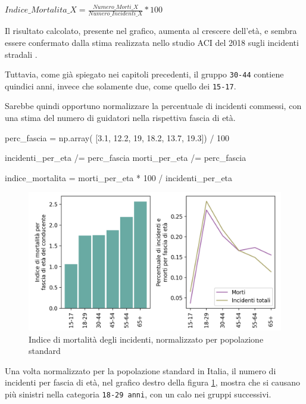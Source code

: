 \documentclass[a4paper]{report}
\newcommand{\columnstyle}[1]{\texttt{#1}}
\begin{document}
\begin{center}
    $Indice\_Mortalita\_X = \displaystyle \frac{Numero\_Morti\_X}{Numero\_Incidenti\_X} * 100$ 
\end{center}

Il risultato calcolato, presente nel grafico, aumenta al crescere dell'età, 
e sembra essere confermato dalla stima realizzata nello studio 
ACI del 2018 sugli incidenti stradali \cite{ACI:3}. 

Tuttavia, come già spiegato nei capitoli precedenti, il gruppo \columnstyle{30-44} 
contiene quindici anni, invece che solamente due, come quello dei \columnstyle{15-17}. 

Sarebbe quindi opportuno normalizzare la percentuale di incidenti commessi, 
con una stima del numero di guidatori nella rispettiva fascia di età. 

\begin{code}
perc_fascia = np.array( [3.1, 12.2, 19, 18.2, 13.7, 19.3]) / 100

incidenti_per_eta /= perc_fascia
morti_per_eta /= perc_fascia

indice_mortalita = morti_per_eta * 100 / incidenti_per_eta
\end{code}

\begin{figure}
    \includegraphics[width=\linewidth]{../src/incidenti/incidenti_senza_coords/mortalita/indice_mort_norm.png}
    \caption{Indice di mortalità degli incidenti, normalizzato per popolazione standard}
    \label{fig:indice-mort-norm}
\end{figure}

Una volta normalizzato per la popolazione standard in Italia, il numero di incidenti per 
fascia di età, nel grafico destro della figura \ref{fig:indice-mort-norm}, mostra che  
si causano più sinistri nella categoria \columnstyle{18-29 anni}, 
con un calo nei gruppi successivi. 
\end{document}
